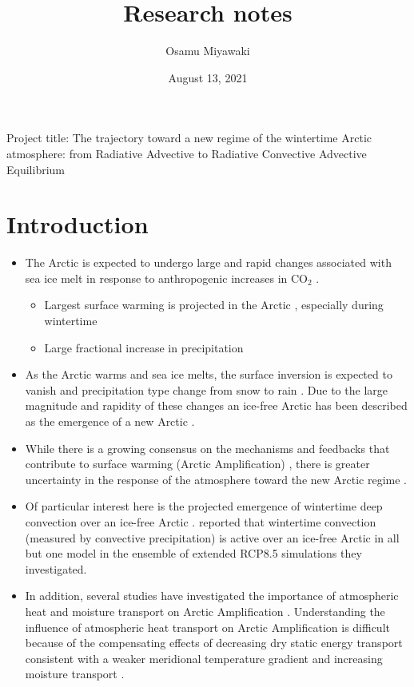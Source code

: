 \documentclass{article}
\title{Research notes}
\date{August 13, 2021}
\author{Osamu Miyawaki}
\begin{document}
\maketitle

Project title: The trajectory toward a new regime of the wintertime Arctic atmosphere: from Radiative Advective to Radiative Convective Advective Equilibrium

\section*{Introduction}
\begin{itemize}
    \item The Arctic is expected to undergo large and rapid changes associated with sea ice melt in response to anthropogenic increases in CO$_2$ \citep{dai2019, feldl2020}.
    \begin{itemize}
        \item Largest surface warming is projected in the Arctic \citep[Arctic Amplification, e.g.][]{manabe1975, held1993a}, especially during wintertime \citep{lu2009}
        \item Large fractional increase in precipitation \citep{bintanja2014,siler2018}
    \end{itemize}
    \item As the Arctic warms and sea ice melts, the surface inversion is expected to vanish \citep{bintanja2012} and precipitation type change from snow to rain \citep{bintanja2017}. Due to the large magnitude and rapidity of these changes an ice-free Arctic has been described as the emergence of a new Arctic \citep{serreze2006, landrum2020}.
    \item While there is a growing consensus on the mechanisms and feedbacks that contribute to surface warming (Arctic Amplification) \citep[e.g.,][]{pithan2014, feldl2020}, there is greater uncertainty in the response of the atmosphere toward the new Arctic regime \citep{screen2018}.
    \item Of particular interest here is the projected emergence of wintertime deep convection over an ice-free Arctic \citep{abbot2008a}. \cite{hankel2021} reported that wintertime convection (measured by convective precipitation) is active over an ice-free Arctic in all but one model in the ensemble of extended RCP8.5 simulations they investigated. 
    \item In addition, several studies have investigated the importance of atmospheric heat and moisture transport on Arctic Amplification \citep{graversen2006,graversen2008,hwang2011,woods2016}. Understanding the influence of atmospheric heat transport on Arctic Amplification is difficult because of the compensating effects of decreasing dry static energy transport consistent with a weaker meridional temperature gradient \citep{chemke2020} and increasing moisture transport \citep{hwang2011, graversen2016}.

\end{itemize}
\end{document}
